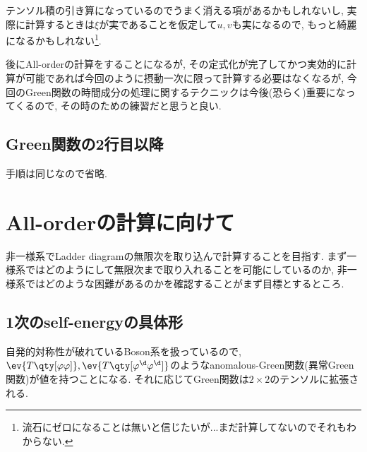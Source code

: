 \documentclass[10.5pt,a4paper]{jreport}
\begin{document}
テンソル積の引き算になっているのでうまく消える項があるかもしれないし, 実際に計算するときは$\xi$が実であることを仮定して$u, v$も実になるので, もっと綺麗になるかもしれない\footnote{流石にゼロになることは無いと信じたいが...まだ計算してないのでそれもわからない.}.

後にAll-orderの計算をすることになるが, その定式化が完了してかつ実効的に計算が可能であれば今回のように摂動一次に限って計算する必要はなくなるが, 今回のGreen関数の時間成分の処理に関するテクニックは今後(恐らく)重要になってくるので, その時のための練習だと思うと良い. 
\subsection{Green関数の2行目以降}
手順は同じなので省略. 
\section{All-orderの計算に向けて}
非一様系でLadder diagramの無限次を取り込んで計算することを目指す. まず一様系ではどのようにして無限次まで取り入れることを可能にしているのか, 非一様系ではどのような困難があるのかを確認することがまず目標とするところ.
\subsection{1次のself-energyの具体形}
自発的対称性が破れているBoson系を扱っているので, $\ev{T\qty[\varphi\varphi]}, \ev{T\qty[\varphi^\d\varphi^\d]}$のようなanomalous-Green関数(異常Green関数)が値を持つことになる. それに応じてGreen関数は$2\times2$のテンソルに拡張される.
\end{document}
